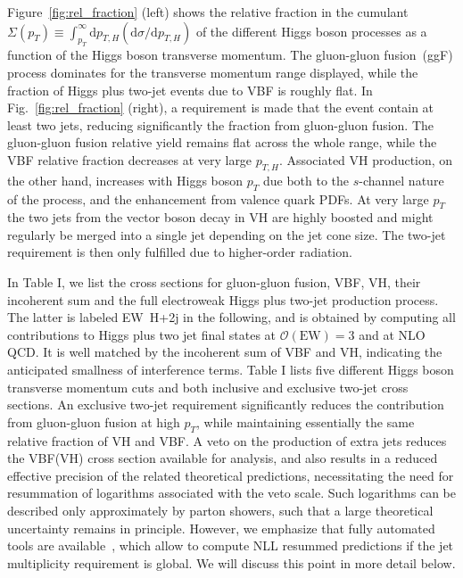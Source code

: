 \documentclass[10pt,prd,fleqn,superscriptaddress,notitlepage,nofootinbib,preprintnumbers,nobalancelastpage]{revtex4-1}
\newcommand{\VBF}{VBF\xspace}
\newcommand{\VH}{VH\xspace}
\begin{document}
Figure~\ref{fig:rel_fraction} (left) shows the relative fraction in the cumulant
$\Sigma(p_T) \equiv \int_{p_T}^\infty \mathrm{d}p_{T,H} (\mathrm{d}\sigma / \mathrm{d}p_{T,H})$
of the different Higgs boson processes as a function of the Higgs boson transverse momentum. 
The gluon-gluon fusion~(ggF) process dominates for the transverse momentum range displayed, while 
the fraction of Higgs plus two-jet events due to \VBF is roughly flat.
In Fig.~\ref{fig:rel_fraction} (right), a requirement is made that the event contain at least two jets,
reducing significantly the fraction from gluon-gluon fusion.
The gluon-gluon fusion relative yield remains flat across the whole range, while the \VBF{} relative fraction decreases at very large $p_{T,H}$.
Associated VH production, on the other hand,  increases with Higgs boson $p_T$ due both to the $s$-channel nature of the process, and the enhancement from valence quark PDFs. At very large $p_T$ the two jets from the vector boson decay in \VH are highly boosted and might regularly be merged into a single jet depending on the jet cone size. The two-jet requirement is then only fulfilled due to higher-order radiation.


In Table I, we list the cross sections for gluon-gluon fusion, \VBF, \VH, their incoherent sum and the full electroweak Higgs plus two-jet production process. The latter is labeled EW~H+2j in the following, and is obtained by computing all contributions to Higgs plus two jet final states at $\mathcal{O}(\text{EW})=3$ and at NLO QCD. It is well matched by the incoherent sum of \VBF and \VH, indicating the anticipated smallness of interference terms.
Table I lists five different Higgs boson transverse momentum cuts and both inclusive and exclusive two-jet cross sections. An exclusive two-jet requirement significantly reduces the contribution from gluon-gluon fusion at high $p_T$, while maintaining essentially the same relative fraction of \VH and \VBF. A veto on the production of extra jets reduces the \VBF (\VH) cross section available for analysis, and also results in a reduced effective precision of the related theoretical predictions, necessitating the need for resummation of logarithms associated with the veto scale. Such logarithms can be described only approximately by parton showers, such that a large theoretical uncertainty remains in principle. However, we emphasize that fully automated tools are available~\cite{Gerwick:2014gya,Baberuxki:2019ifp,Baron:2020xoi,Caletti:2021oor}, which allow to compute NLL resummed predictions if the jet multiplicity requirement is global. We will discuss this point in more detail below.
\end{document}
